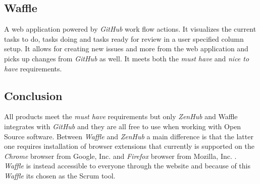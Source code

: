 \subsection*{Waffle}
A web application powered by \textit{GitHub} work flow actions. 
It visualizes the current tasks to do, tasks doing and tasks ready for review in a user specified column setup. 
It allows for creating new issues and more from the web application and picks up changes from \textit{GitHub} as well. 
It meets both the \textit{must have} and \textit{nice to have} requirements.

\subsection*{Conclusion}
All products meet the \textit{must have} requirements but only \textit{ZenHub} and Waffle integrates with \textit{GitHub} and they are all free to use when working with Open Source software.
Between \textit{Waffle} and \textit{ZenHub} a main difference is that the latter one requires installation of browser extensions that currently is supported on the \textit{Chrome} browser from Google, Inc. and \textit{Firefox} browser from Mozilla, Inc.  \citep{preStudy:scrum:zenhub}.
\textit{Waffle} is instead accessible to everyone through the website and because of this \textit{Waffle} its chosen as the Scrum tool.
